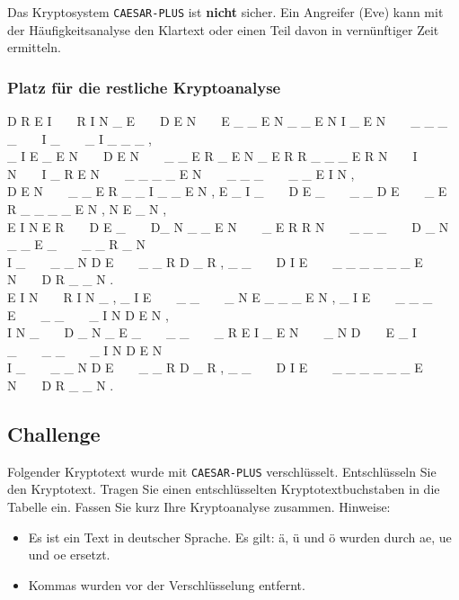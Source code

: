 \begin{important}
Das Kryptosystem \texttt{CAESAR-PLUS} ist \textbf{nicht} sicher. Ein Angreifer (Eve) kann mit der Häufigkeitsanalyse den Klartext oder einen Teil davon in vernünftiger Zeit ermitteln.
\end{important}

\subsubsection{Platz für die restliche Kryptoanalyse}

\resetlinenumber[1]
\begin{linenumbers}
\small
D R E I~~~~R I N \_ E~~~~D E N~~~~E \_ \_ E N \_ \_ E N I \_ E N~~~~\_ \_ \_ \_~~~~I \_~~~~\_ I \_ \_ \_ ,\\
\_ I E \_ E N~~~~D E N~~~~\_ \_ E R \_ E N \_ E R R \_ \_ \_ E R N~~~~I N~~~~I \_ R E N~~~~\_ \_ \_ \_ E N~~~~\_ \_ \_~~~~\_ \_ E I N ,\\
D E N~~~~\_ \_ E R \_ \_ I \_ \_ E N , E \_ I \_~~~~D E \_~~~~\_ \_ D E~~~~\_ E R \_ \_ \_ \_ E N , N E \_ N ,\\
E I N E R~~~~D E \_~~~~D\_ N \_ \_ E N~~~~\_ E R R N~~~~\_ \_ \_~~~~D \_ N \_ \_ E \_~~~~\_ \_ R \_ N \\
I \_~~~~\_ \_ N D E~~~~\_ \_ R D \_ R , \_ \_~~~~D I E~~~~\_ \_ \_ \_ \_ \_ E N~~~~D R \_ \_ N .\\
E I N~~~~R I N \_ , \_ I E~~~~\_ \_~~~~\_ N E \_ \_ \_ E N , \_ I E~~~~\_ \_ \_ E~~~~\_ \_~~~~\_ I N D E N ,\\
I N \_~~~~D \_ N \_ E \_~~~~\_ \_~~~~\_ R E I \_ E N~~~~\_ N D~~~~E \_ I \_~~~~\_ \_~~~~\_ I N D E N \\
I \_~~~~\_ \_ N D E~~~~\_ \_ R D \_ R , \_ \_~~~~D I E~~~~\_ \_ \_ \_ \_ \_ E N~~~~D R \_ \_ N .
\end{linenumbers}


\newpage

\subsection{Challenge}

Folgender Kryptotext wurde mit \texttt{CAESAR-PLUS} verschlüsselt. Entschlüsseln Sie den Kryptotext. Tragen Sie einen entschlüsselten Kryptotextbuchstaben in die Tabelle ein. Fassen Sie kurz Ihre Kryptoanalyse zusammen. Hinweise:

\begin{itemize}
	\item Es ist ein Text in deutscher Sprache. Es gilt: ä, ü und ö wurden durch ae, ue und oe ersetzt.
	\item Kommas wurden vor der Verschlüsselung entfernt.
\end{itemize}

